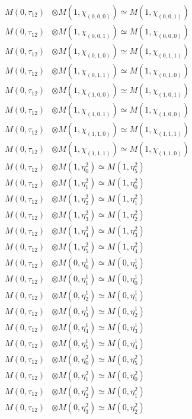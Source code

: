 \begin{align*}
M(0,\tau_{12}) &\otimes M(1,\chi_{(0,0,0)}) \simeq M(1,\chi_{(0,0,1)}) \\
M(0,\tau_{12}) &\otimes M(1,\chi_{(0,0,1)}) \simeq M(1,\chi_{(0,0,0)}) \\
M(0,\tau_{12}) &\otimes M(1,\chi_{(0,1,0)}) \simeq M(1,\chi_{(0,1,1)}) \\
M(0,\tau_{12}) &\otimes M(1,\chi_{(0,1,1)}) \simeq M(1,\chi_{(0,1,0)}) \\
M(0,\tau_{12}) &\otimes M(1,\chi_{(1,0,0)}) \simeq M(1,\chi_{(1,0,1)}) \\
M(0,\tau_{12}) &\otimes M(1,\chi_{(1,0,1)}) \simeq M(1,\chi_{(1,0,0)}) \\
M(0,\tau_{12}) &\otimes M(1,\chi_{(1,1,0)}) \simeq M(1,\chi_{(1,1,1)}) \\
M(0,\tau_{12}) &\otimes M(1,\chi_{(1,1,1)}) \simeq M(1,\chi_{(1,1,0)}) \\
M(0,\tau_{12}) &\otimes M(1,\eta^{2}_{0}) \simeq M(1,\eta^{2}_{5}) \\
M(0,\tau_{12}) &\otimes M(1,\eta^{2}_{1}) \simeq M(1,\eta^{2}_{0}) \\
M(0,\tau_{12}) &\otimes M(1,\eta^{2}_{2}) \simeq M(1,\eta^{2}_{1}) \\
M(0,\tau_{12}) &\otimes M(1,\eta^{2}_{3}) \simeq M(1,\eta^{2}_{2}) \\
M(0,\tau_{12}) &\otimes M(1,\eta^{2}_{4}) \simeq M(1,\eta^{2}_{3}) \\
M(0,\tau_{12}) &\otimes M(1,\eta^{2}_{5}) \simeq M(1,\eta^{2}_{4}) \\
M(0,\tau_{12}) &\otimes M(0,\eta^{1}_{0}) \simeq M(0,\eta^{1}_{5}) \\
M(0,\tau_{12}) &\otimes M(0,\eta^{1}_{1}) \simeq M(0,\eta^{1}_{0}) \\
M(0,\tau_{12}) &\otimes M(0,\eta^{1}_{2}) \simeq M(0,\eta^{1}_{1}) \\
M(0,\tau_{12}) &\otimes M(0,\eta^{1}_{3}) \simeq M(0,\eta^{1}_{2}) \\
M(0,\tau_{12}) &\otimes M(0,\eta^{1}_{4}) \simeq M(0,\eta^{1}_{3}) \\
M(0,\tau_{12}) &\otimes M(0,\eta^{1}_{5}) \simeq M(0,\eta^{1}_{4}) \\
M(0,\tau_{12}) &\otimes M(0,\eta^{2}_{0}) \simeq M(0,\eta^{2}_{5}) \\
M(0,\tau_{12}) &\otimes M(0,\eta^{2}_{1}) \simeq M(0,\eta^{2}_{0}) \\
M(0,\tau_{12}) &\otimes M(0,\eta^{2}_{2}) \simeq M(0,\eta^{2}_{1}) \\
M(0,\tau_{12}) &\otimes M(0,\eta^{2}_{3}) \simeq M(0,\eta^{2}_{2}) \\

\end{align*}

